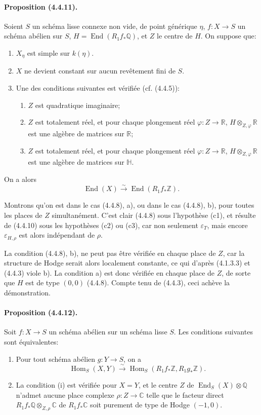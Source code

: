 \documentclass[10pt]{article}
\newcommand{\C}{\mathbb C}
\newcommand{\Q}{\mathbb Q}
\newcommand{\Z}{\mathbb Z}
\newcommand{\Hom}{\operatorname{Hom}}
\newcommand{\iso}{\xrightarrow{\sim}}
\newcommand{\R}{\mathbb R}
\providecommand{\End}{\operatorname{End}}
\begin{document}
\paragraph{Proposition (4.4.11).} Soient $S$ un schéma lisse connexe non vide, de point générique $\eta$, $f:X\to S$ un schéma abélien sur $S$, $H=\End(R_1f_*\Q)$, et $Z$ le centre de $H$. On suppose que:
\begin{enumerate}[label=(\alph*)]
\item $X_\eta$ est simple sur $k(\eta)$.
\item $X$ ne devient constant sur aucun revêtement fini de $S$.
\item Une des conditions suivantes est vérifiée (cf. (4.4.5)):
\begin{enumerate}[label=(c\arabic*)]
\item $Z$ est quadratique imaginaire;
\item $Z$ est totalement réel, et pour chaque plongement réel $\varphi:Z\to\R$, $H\otimes_{Z,\varphi}\R$ est une algèbre de matrices sur $\R$;
\item $Z$ est totalement réel, et pour chaque plongement réel $\varphi:Z\to\R$, $H\otimes_{Z,\varphi}\R$ est une algèbre de matrices sur $\mathbb H$.
\end{enumerate}
\end{enumerate}
On a alors
\[
\End(X)\iso \End(R_1f_*\Z).
\]

Montrons qu'on est dans le cas (4.4.8), a), ou dans le cas (4.4.8), b), pour toutes les places de $Z$ simultanément. C'est clair (4.4.8) sous l'hypothèse (c1), et résulte de (4.4.10) sous les hypothèses (c2) ou (c3), car non seulement $\varepsilon_T$, mais encore $\varepsilon_{H,\rho}$ est alors indépendant de $\rho$.

La condition (4.4.8), b), ne peut pas être vérifiée en chaque place de $Z$, car la structure de Hodge serait alors localement constante, ce qui d'après (4.1.3.3) et (4.4.3) viole b). La condition a) est donc vérifiée en chaque place de $Z$, de sorte que $H$ est de type $(0,0)$ (4.4.8). Compte tenu de (4.4.3), ceci achève la démonstration.

\paragraph{Proposition (4.4.12).} Soit $f:X\to S$ un schéma abélien sur un schéma lisse $S$. Les conditions suivantes sont équivalentes:
\begin{enumerate}[label=(\roman*)]
\item Pour tout schéma abélien $g:Y\to S$, on a
\[
\Hom_S(X,Y)\iso \Hom_S(R_1f_*\Z,R_1g_*\Z).
\]
\item La condition (i) est vérifiée pour $X=Y$, et le centre $Z$ de $\End_S(X)\otimes\Q$ n'admet aucune place complexe $\rho:Z\to\C$ telle que le facteur direct $R_1f_*\Q\otimes_{Z,\rho}\C$ de $R_1f_*\C$ soit purement de type de Hodge $(-1,0)$.
\end{enumerate}
\end{document}

